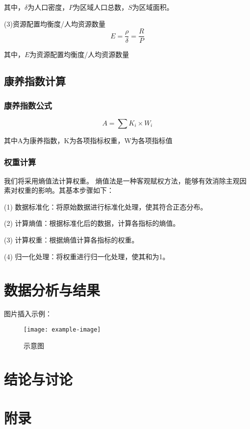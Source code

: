 \documentclass[12pt,a4paper]{article}
\begin{document}
其中，$\delta$为人口密度，$P$为区域人口总数，$S$为区域面积。

(3)资源配置均衡度/人均资源数量
\[
E = \frac{\rho}{\delta}=\frac{R}{P}
\]

其中，$E$为资源配置均衡度/人均资源数量

\subsection{康养指数计算}

\subsubsection{康养指数公式}

\[A = \sum K_i \times W_i\]

其中A为康养指数，K为各项指标权重，W为各项指标值

\subsubsection{权重计算}

我们将采用熵值法\cite{02}计算权重。
熵值法是一种客观赋权方法，能够有效消除主观因素对权重的影响。其基本步骤如下：

(1) 数据标准化：将原始数据进行标准化处理，使其符合正态分布。

(2) 计算熵值：根据标准化后的数据，计算各指标的熵值。

(3) 计算权重：根据熵值计算各指标的权重。

(4) 归一化处理：将权重进行归一化处理，使其和为1。

\section{数据分析与结果}
图片插入示例：
\begin{figure}[h]
    \centering
    \texttt{[image: example-image]} %
    \caption{示意图}
\end{figure}

\section{结论与讨论}

\onecolumn
\newpage
\section*{附录}
\end{document}
